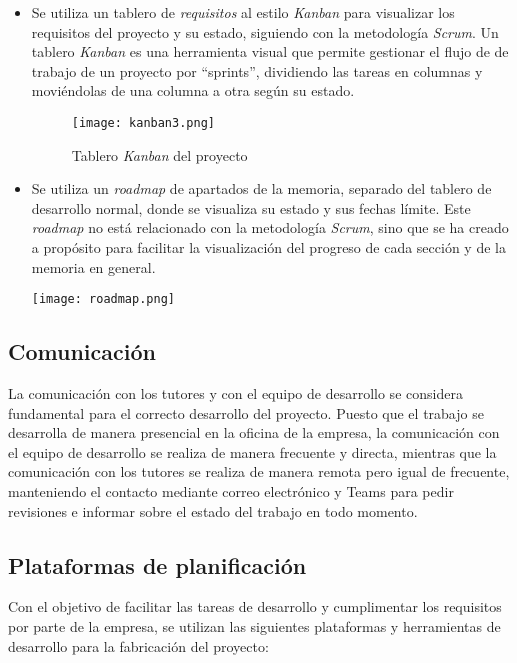 \begin{itemize}
	\item Se utiliza un tablero de \textit{requisitos} al estilo \textit{Kanban}
		para visualizar los requisitos del proyecto y su estado, siguiendo con
		la metodología \textit{Scrum}. Un tablero \textit{Kanban} es una
		herramienta visual que permite gestionar el flujo de de trabajo de un
		proyecto por ``sprints'', dividiendo las tareas en columnas y
		moviéndolas de una columna a otra según su estado.

		\begin{figure}[H]
			\centering
			\texttt{[image: kanban3.png]}
			\caption{Tablero \textit{Kanban} del proyecto}
			\label{fig:kanban}
		\end{figure}
	\item Se utiliza un \textit{roadmap} de apartados de la memoria, separado
		del tablero de desarrollo normal, donde se visualiza su estado y sus
		fechas límite. Este \textit{roadmap} no está relacionado con la
		metodología \textit{Scrum}, sino que se ha creado a propósito para
		facilitar la visualización del progreso de cada sección y de la memoria
		en general.

		\begin{minipage}{\linewidth}
			\centering
			\texttt{[image: roadmap.png]}
		\end{minipage}
\end{itemize}


\subsection{Comunicación}\label{subsec:comunicación}
La comunicación con los tutores y con el equipo de desarrollo se considera
fundamental para el correcto desarrollo del proyecto. Puesto que el trabajo se
desarrolla de manera presencial en la oficina de la empresa, la comunicación con
el equipo de desarrollo se realiza de manera frecuente y directa, mientras que
la comunicación con los tutores se realiza de manera remota pero igual de
frecuente, manteniendo el contacto mediante correo electrónico y Teams para
pedir revisiones e informar sobre el estado del trabajo en todo momento.

\subsection{Plataformas de planificación}\label{subsec:plataformas}
Con el objetivo de facilitar las tareas de desarrollo y cumplimentar los
requisitos por parte de la empresa, se utilizan las siguientes plataformas y
herramientas de desarrollo para la fabricación del proyecto:

